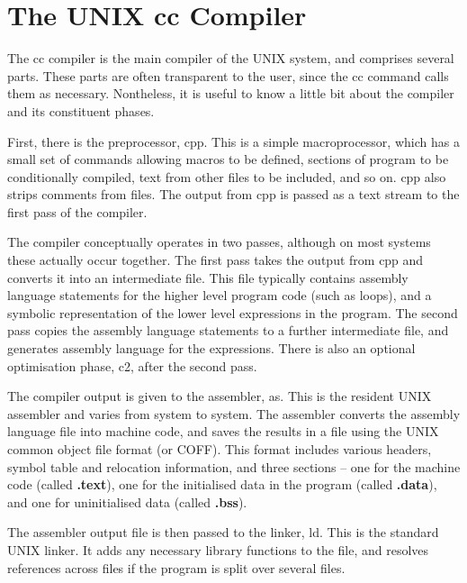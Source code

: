 \cleardoublepage
\chapter{The UNIX {\cmd cc} Compiler}
\label{cc}
     The {\cmd cc} compiler is the main compiler of the UNIX system,
and comprises  several parts.  These parts  are often  transparent to
the user,  since  the  {\cmd cc} command calls them as necessary.
Nontheless, it is useful to know a little bit about the compiler and
its constituent phases.

     First, there  is the  {\kc preprocessor\/}, {\cmd cpp}. This is a 
simple macroprocessor, which has  a small  set of commands allowing
macros to be defined, sections of program to  be conditionally 
compiled, text  from other files to be included, and so  on. {\cmd
cpp} also strips comments from files. The output from {\cmd cpp} is
passed as a text stream to the first pass of the compiler.

     The compiler  conceptually operates  in  two  passes,  although 
on  most systems these  actually occur  together. The  first pass
takes the output from {\cmd cpp} and  converts it  into an 
intermediate file. This file typically contains assembly language 
statements for  the higher  level  program  code  (such  as loops),
and  a symbolic  representation of  the lower level expressions in
the program. The  second pass copies the assembly language statements
to a further intermediate file, and generates assembly language for
the expressions. There is also an optional optimisation phase, {\cmd
c2}, after the second pass.

     The compiler  output is   given  to the  {\kc assembler\/},
{\cmd as}.  This is  the resident UNIX  assembler and  varies from 
system to  system.  The  assembler converts the  assembly language 
file into machine code, and saves the results in a file using the
 UNIX common  object file  format (or  COFF). This  format
includes various  headers, symbol  table and relocation information,
and three sections -- one for  the machine  code (called {\bf
.text}), one for the initialised data in the program (called {\bf
.data}), and one for  uninitialised data (called {\bf .bss}).

     The assembler  output file  is then passed to the {\kc linker\/}, 
{\cmd ld}. This is the standard UNIX linker. It adds any necessary
library functions to the file, and resolves references across files
if the program is split over several files.

